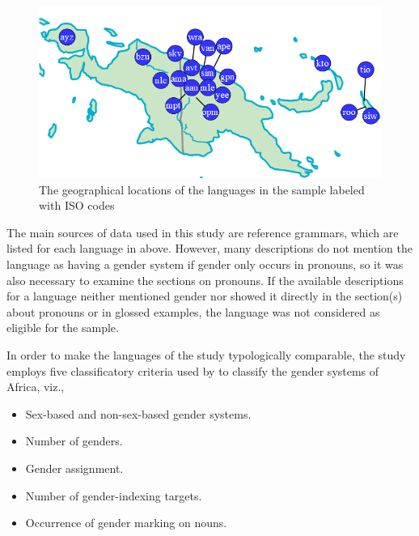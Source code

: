 \documentclass[output=collectionpaper]{langsci/langscibook}
\begin{document}

\begin{figure}[htb]
\includegraphics[width=\textwidth]{figures/09/Simple/fig1.png}
\caption{The geographical locations of the languages in the sample labeled with ISO codes}
\label{fig:Svard:1}
\end{figure}


The main sources of data used in this study are reference grammars, which are listed for each language in  above. However, many descriptions do not mention the language as having a gender system if gender only occurs in pronouns, so it was also necessary to examine the sections on pronouns. If the available descriptions for a language neither mentioned gender nor showed it directly in the section(s) about pronouns or in glossed examples, the language was not considered as eligible for the sample.

In order to make the languages of the study typologically comparable, the study employs five classificatory criteria used by \citet{DiGarbo2014} to classify the gender systems of Africa, viz.,

\begin{itemize}
\item Sex-based and non-sex-based gender systems.
\item Number of genders.
\item Gender assignment.
\item Number of gender-indexing targets.
\item Occurrence of gender marking on nouns.
\end{itemize}
\end{document}
